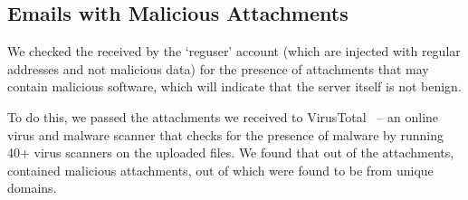 \subsection{Emails with Malicious Attachments}
We checked the \emails received by the `reguser' account (which are injected with regular \email addresses and not malicious data) for the presence of attachments that may contain malicious software, which will indicate that the server itself is not benign. 

To do this, we passed the \totalattachmentcount attachments we received to VirusTotal~\cite{virustotal} -- an online virus and malware scanner that checks for the presence of malware by running 40+ virus scanners on the uploaded files. We found that out of the \totalattachmentcount attachments, \totalvirusemails \emails contained malicious attachments, out of which \totalvirusattachmentcount were found to be from unique domains. 
